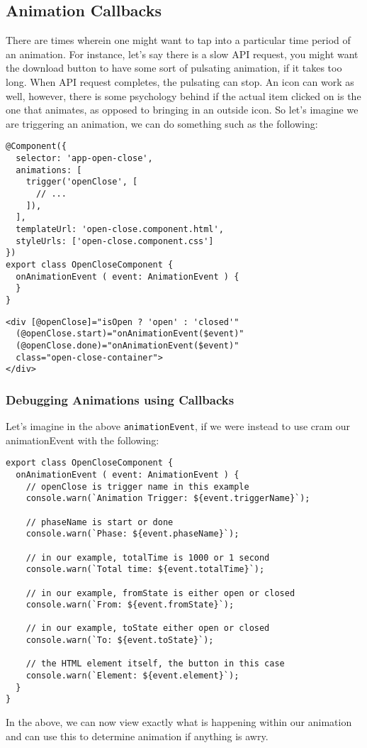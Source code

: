 
\subsection{ Animation Callbacks }
There are times wherein one might want to tap into a particular time period of
an animation. For instance, let's say there is a slow API request, you might 
want the download button to have some sort of pulsating animation, if it takes
too long. When API request completes, the pulsating can stop. An icon can work 
as well, however, there is some psychology behind if the actual item clicked 
on is the one that animates, as opposed to bringing in an outside icon. So 
let's imagine we are triggering an animation, we can do something such as 
the following: 
\begin{lstlisting}[caption=open-close.component.ts]
@Component({
  selector: 'app-open-close',
  animations: [
    trigger('openClose', [
      // ...
    ]),
  ],
  templateUrl: 'open-close.component.html',
  styleUrls: ['open-close.component.css']
})
export class OpenCloseComponent {
  onAnimationEvent ( event: AnimationEvent ) {
  }
}  
\end{lstlisting}

\begin{lstlisting}[caption=open-close.component.html]
<div [@openClose]="isOpen ? 'open' : 'closed'"
  (@openClose.start)="onAnimationEvent($event)"
  (@openClose.done)="onAnimationEvent($event)"
  class="open-close-container">
</div>
\end{lstlisting}

\subsubsection{ Debugging Animations using Callbacks }
Let's imagine in the above \lstinline{animationEvent}, if we were instead to
use cram our animationEvent with the following: 
\begin{lstlisting}[caption=open-close.component.ts]
export class OpenCloseComponent {
  onAnimationEvent ( event: AnimationEvent ) {
    // openClose is trigger name in this example
    console.warn(`Animation Trigger: ${event.triggerName}`);

    // phaseName is start or done
    console.warn(`Phase: ${event.phaseName}`);

    // in our example, totalTime is 1000 or 1 second
    console.warn(`Total time: ${event.totalTime}`);

    // in our example, fromState is either open or closed
    console.warn(`From: ${event.fromState}`);

    // in our example, toState either open or closed
    console.warn(`To: ${event.toState}`);

    // the HTML element itself, the button in this case
    console.warn(`Element: ${event.element}`);
  }
}  
\end{lstlisting}

In the above, we can now view exactly what is happening within our animation 
and can use this to determine animation if anything is awry. 